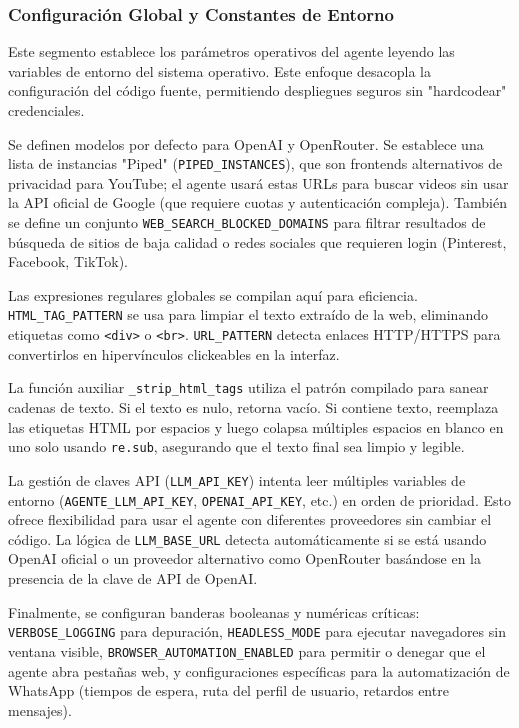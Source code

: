 \documentclass[letterpaper,12pt]{article}
\begin{document}
\subsubsection{Configuración Global y Constantes de Entorno}

Este segmento establece los parámetros operativos del agente leyendo las variables de entorno del sistema operativo. Este enfoque desacopla la configuración del código fuente, permitiendo despliegues seguros sin "hardcodear" credenciales.

Se definen modelos por defecto para OpenAI y OpenRouter. Se establece una lista de instancias "Piped" (\texttt{PIPED\_INSTANCES}), que son frontends alternativos de privacidad para YouTube; el agente usará estas URLs para buscar videos sin usar la API oficial de Google (que requiere cuotas y autenticación compleja). También se define un conjunto \texttt{WEB\_SEARCH\_BLOCKED\_DOMAINS} para filtrar resultados de búsqueda de sitios de baja calidad o redes sociales que requieren login (Pinterest, Facebook, TikTok).

Las expresiones regulares globales se compilan aquí para eficiencia. \texttt{HTML\_TAG\_PATTERN} se usa para limpiar el texto extraído de la web, eliminando etiquetas como \texttt{<div>} o \texttt{<br>}. \texttt{URL\_PATTERN} detecta enlaces HTTP/HTTPS para convertirlos en hipervínculos clickeables en la interfaz.

La función auxiliar \texttt{\_strip\_html\_tags} utiliza el patrón compilado para sanear cadenas de texto. Si el texto es nulo, retorna vacío. Si contiene texto, reemplaza las etiquetas HTML por espacios y luego colapsa múltiples espacios en blanco en uno solo usando \texttt{re.sub}, asegurando que el texto final sea limpio y legible.

La gestión de claves API (\texttt{LLM\_API\_KEY}) intenta leer múltiples variables de entorno (\texttt{AGENTE\_LLM\_API\_KEY}, \texttt{OPENAI\_API\_KEY}, etc.) en orden de prioridad. Esto ofrece flexibilidad para usar el agente con diferentes proveedores sin cambiar el código. La lógica de \texttt{LLM\_BASE\_URL} detecta automáticamente si se está usando OpenAI oficial o un proveedor alternativo como OpenRouter basándose en la presencia de la clave de API de OpenAI.

Finalmente, se configuran banderas booleanas y numéricas críticas: \texttt{VERBOSE\_LOGGING} para depuración, \texttt{HEADLESS\_MODE} para ejecutar navegadores sin ventana visible, \texttt{BROWSER\_AUTOMATION\_ENABLED} para permitir o denegar que el agente abra pestañas web, y configuraciones específicas para la automatización de WhatsApp (tiempos de espera, ruta del perfil de usuario, retardos entre mensajes).
\end{document}
